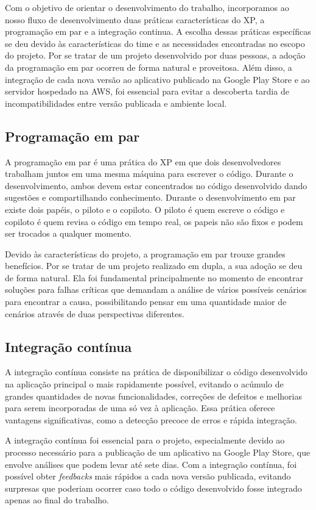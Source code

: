 Com o objetivo de orientar o desenvolvimento do trabalho, incorporamos ao nosso fluxo de desenvolvimento duas práticas características do XP, a programação em par e a integração continua. A escolha dessas práticas específicas se deu devido às características do time e as necessidades encontradas no escopo do projeto. Por se tratar de um projeto desenvolvido por duas pessoas, a adoção da programação em par ocorreu de forma natural e proveitosa. Além disso, a integração de cada nova versão ao aplicativo publicado na Google Play Store e ao servidor hospedado na AWS, foi essencial para evitar a descoberta tardia de incompatibilidades entre versão publicada e ambiente local.

\subsection{Programação em par}
A programação em par é uma prática do XP em que dois desenvolvedores trabalham juntos em uma mesma máquina para escrever o código. Durante o desenvolvimento, ambos devem estar concentrados no código desenvolvido dando sugestões e compartilhando conhecimento. Durante o desenvolvimento em par existe dois papéis, o piloto e o copiloto. O piloto é quem escreve o código e copiloto é quem revisa o código em tempo real, os papeis não são fixos e podem ser trocados a qualquer momento.

Devido às características do projeto, a programação em par trouxe grandes benefícios. Por se tratar de um projeto realizado em dupla, a sua adoção se deu de forma natural. Ela foi fundamental principalmente no momento de encontrar soluções para falhas críticas que demandam a análise de vários possíveis cenários para encontrar a causa, possibilitando pensar em uma quantidade maior de cenários através de duas perspectivas diferentes.

\subsection{Integração contínua}
A integração contínua consiste na prática de disponibilizar o código desenvolvido na aplicação principal o mais rapidamente possível, evitando o acúmulo de grandes quantidades de novas funcionalidades, correções de defeitos e melhorias para serem incorporadas de uma só vez à aplicação. Essa prática oferece vantagens significativas, como a detecção precoce de erros e rápida integração.

A integração contínua foi essencial para o projeto, especialmente devido ao processo necessário para a publicação de um aplicativo na Google Play Store, que envolve análises que podem levar até sete dias. Com a integração contínua, foi possível obter \textit{feedbacks} mais rápidos a cada nova versão publicada, evitando surpresas que poderiam ocorrer caso todo o código desenvolvido fosse integrado apenas ao final do trabalho.

